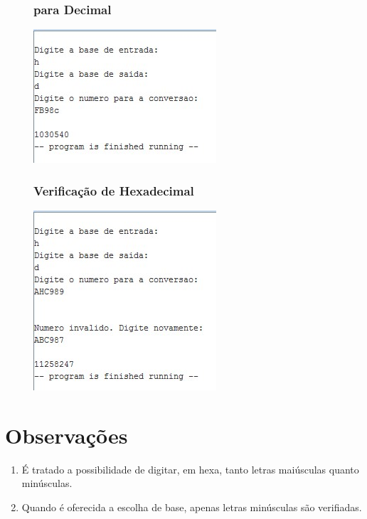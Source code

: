 \documentclass[10pt,a4paper]{article}
\begin{document}
\begin{figure}[H]
\begin{minipage}[t]{.5\textwidth}
\subsubsection{para Decimal}
\includegraphics[width=\textwidth]{HD.jpg}
\end{minipage}
\begin{minipage}[t]{.5\textwidth}
\subsubsection{Verificação de Hexadecimal}
\includegraphics[width=\textwidth]{HexFail.jpg}
\end{minipage}
\end{figure}
\newpage
\section{Observações}
\begin{enumerate}
\item É tratado a possibilidade de digitar, em hexa, tanto letras maiúsculas quanto minúsculas.
\item Quando é oferecida a escolha de base, apenas letras minúsculas são verifiadas.
\end{enumerate}
\end{document}
